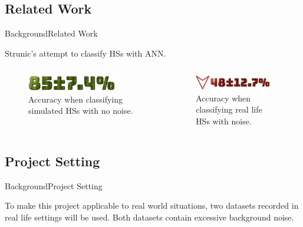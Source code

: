 \documentclass[10pt]{beamer}
\begin{document}

\subsection{Related Work}

\begin{frame}{Background}{Related Work}

\begin{block}{Strunic's attempt to classify HSs with ANN.}
	
	\begin{columns}
		
		    \vspace{0.3cm}
			\begin{figure}
			\includegraphics[width=0.8\textwidth,height=0.2\textheight]{AAUgraphics/strunic8.png}
				\caption{Accuracy when classifying simulated HSs with no noise.}
		\end{figure}
	
	
	
		
			\begin{figure}
			\includegraphics[width=0.9\textwidth,height=0.25\textheight]{AAUgraphics/strunic42.png}
			\caption{Accuracy when classifying real life HSs with noise.}
		\end{figure}
		

     
    \end{columns}

		
	\end{block}
	
\end{frame}


\subsection{Project Setting}

\begin{frame}{Background}{Project Setting}

\begin{block}{}
	
	
	  {\Large To make this project applicable to real world situations, two datasets recorded in real life settings will be used. Both datasets contain excessive background noise.}
		
\end{block}

\end{frame}
\end{document}
